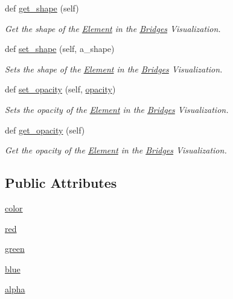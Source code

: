 \begin{DoxyCompactItemize}
def \hyperlink{class_bridges_1_1_element_visualizer_1_1_element_visualizer_aa1fe7978af156f5a2a2cad15eda02287}{get\+\_\+shape} (self)
\begin{DoxyCompactList}\small\item\em Get the shape of the \hyperlink{namespace_bridges_1_1_element}{Element} in the \hyperlink{namespace_bridges_1_1_bridges}{Bridges} Visualization. \end{DoxyCompactList}\item 
def \hyperlink{class_bridges_1_1_element_visualizer_1_1_element_visualizer_a82348f58c951b0608ec4fb04eaa3e097}{set\+\_\+shape} (self, a\+\_\+shape)
\begin{DoxyCompactList}\small\item\em Sets the shape of the \hyperlink{namespace_bridges_1_1_element}{Element} in the \hyperlink{namespace_bridges_1_1_bridges}{Bridges} Visualization. \end{DoxyCompactList}\item 
def \hyperlink{class_bridges_1_1_element_visualizer_1_1_element_visualizer_a35f9781eaadd9ce1149cfbc8475a3c51}{set\+\_\+opacity} (self, \hyperlink{class_bridges_1_1_element_visualizer_1_1_element_visualizer_ab26841a89ad63bac0828c15b01ec92b2}{opacity})
\begin{DoxyCompactList}\small\item\em Sets the opacity of the \hyperlink{namespace_bridges_1_1_element}{Element} in the \hyperlink{namespace_bridges_1_1_bridges}{Bridges} Visualization. \end{DoxyCompactList}\item 
def \hyperlink{class_bridges_1_1_element_visualizer_1_1_element_visualizer_a54a58179a82e3d571069f2918114ce9e}{get\+\_\+opacity} (self)
\begin{DoxyCompactList}\small\item\em Get the opacity of the \hyperlink{namespace_bridges_1_1_element}{Element} in the \hyperlink{namespace_bridges_1_1_bridges}{Bridges} Visualization. \end{DoxyCompactList}\end{DoxyCompactItemize}
\subsection*{Public Attributes}
\begin{DoxyCompactItemize}
\item 
\hyperlink{class_bridges_1_1_element_visualizer_1_1_element_visualizer_ab067bb0c9acc370a93b87f15bd7d6e6e}{color}
\item 
\hyperlink{class_bridges_1_1_element_visualizer_1_1_element_visualizer_a44266d81c1904956ae315cefa1cee31a}{red}
\item 
\hyperlink{class_bridges_1_1_element_visualizer_1_1_element_visualizer_a3c23b7a96237fe6e19e498388a199ab5}{green}
\item 
\hyperlink{class_bridges_1_1_element_visualizer_1_1_element_visualizer_ae362091ff72d0848cc387b88ab75d1ab}{blue}
\item 
\hyperlink{class_bridges_1_1_element_visualizer_1_1_element_visualizer_af409ee373431b9dfb0a2266ff5128c84}{alpha}
\end{DoxyCompactItemize}
